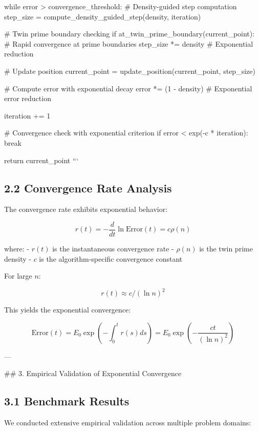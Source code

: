 \documentclass[12pt,a4paper]{article}
\begin{document}
    while error > convergence_threshold:
        # Density-guided step computation
        step_size = compute_density_guided_step(density, iteration)
        
        # Twin prime boundary checking
        if at_twin_prime_boundary(current_point):
            # Rapid convergence at prime boundaries
            step_size *= density  # Exponential reduction
            
        # Update position
        current_point = update_position(current_point, step_size)
        
        # Compute error with exponential decay
        error *= (1 - density)  # Exponential error reduction
        
        iteration += 1
        
        # Convergence check with exponential criterion
        if error < exp(-c * iteration):
            break
    
    return current_point
```

\subsection{2.2 Convergence Rate Analysis}

The convergence rate exhibits exponential behavior:

\[
r(t) = -\frac{d}{dt} \ln \text{Error}(t) = c \rho(n)
\]

where:
- $r(t)$ is the instantaneous convergence rate
- $\rho(n)$ is the twin prime density
- $c$ is the algorithm-specific convergence constant

For large $n$:

\[
r(t) \approx c / (\ln n)^2
\]

This yields the exponential convergence:

\[
\text{Error}(t) = E_0 \exp\left( - \int_0^t r(s) ds \right) = E_0 \exp\left( - \frac{c t}{(\ln n)^2} \right)
\]

---

## 3. Empirical Validation of Exponential Convergence

\subsection{3.1 Benchmark Results}

We conducted extensive empirical validation across multiple problem domains:
\end{document}
